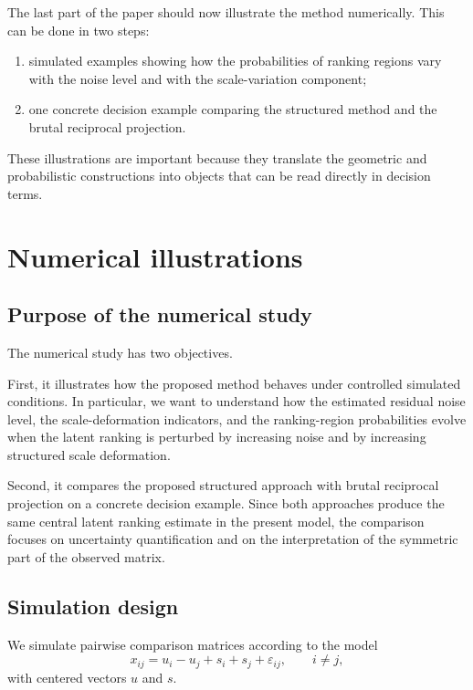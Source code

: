 \documentclass[11pt]{amsart}
\theoremstyle{definition}
\theoremstyle{plain}
\numberwithin{equation}{section}
\begin{document}
The last part of the paper should now illustrate the method numerically. This can be done in two steps:
\begin{enumerate}[label=\textup{(\arabic*)}]
\item simulated examples showing how the probabilities of ranking regions vary with the noise level and with the scale-variation component;
\item one concrete decision example comparing the structured method and the brutal reciprocal projection.
\end{enumerate}

These illustrations are important because they translate the geometric and probabilistic constructions into objects that can be read directly in decision terms.
\section{Numerical illustrations}

\subsection{Purpose of the numerical study}

The numerical study has two objectives.

First, it illustrates how the proposed method behaves under controlled simulated conditions. In particular, we want to understand how the estimated residual noise level, the scale-deformation indicators, and the ranking-region probabilities evolve when the latent ranking is perturbed by increasing noise and by increasing structured scale deformation.

Second, it compares the proposed structured approach with brutal reciprocal projection on a concrete decision example. Since both approaches produce the same central latent ranking estimate in the present model, the comparison focuses on uncertainty quantification and on the interpretation of the symmetric part of the observed matrix.

\subsection{Simulation design}

We simulate pairwise comparison matrices according to the model
\begin{equation}\label{eq:simmodel}
x_{ij}=u_i-u_j+s_i+s_j+\varepsilon_{ij},
\qquad i\neq j,
\end{equation}
with centered vectors $u$ and $s$.
\end{document}
